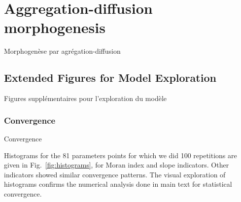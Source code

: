














\newpage

\section{Aggregation-diffusion morphogenesis}{Morphogenèse par agrégation-diffusion}

\label{app:sec:density}




\subsection{Extended Figures for Model Exploration}{Figures supplémentaires pour l'exploration du modèle}


\subsubsection{Convergence}{Convergence}

Histograms for the 81 parameters points for which we did 100 repetitions are given in Fig.~\ref{fig:histograms}, for Moran index and slope indicators. Other indicators showed similar convergence patterns. The visual exploration of histograms confirms the numerical analysis done in main text for statistical convergence.





